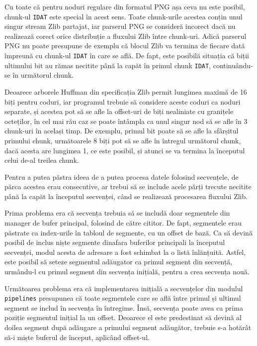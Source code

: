 \documentclass[a4paper,12pt]{report}
\begin{document}
Cu toate că pentru noduri regulare din formatul PNG așa ceva nu este posibil,
chunk-ul \texttt{IDAT} este special în acest sens.
Toate chunk-urile acestea conțin unul singur stream Zlib partajat,
iar parserul PNG se consideră incorect dacă nu realizează corect
orice distribuție a fluxului Zlib între chunk-uri.
Adică parserul PNG nu poate presupune de exemplu că blocul Zlib va termina de fiecare dată
împreună cu chunk-ul \texttt{IDAT} în care se află.
De fapt, este posibilă situația că biții ultimului bit au rămas necitite până la capăt
în primul chunk \texttt{IDAT}, continuându-se în următorul chunk.

Deoarece arborele Huffman din specificația Zlib permit lungimea maximă de 16 biți pentru coduri,
iar programul trebuie să considere aceste coduri ca noduri separate,
și acestea pot să se afle la offset-uri de biți nealiniate cu granițele octeților,
în cel mai rău caz se poate întâmpla ca unul singur nod să se afle în 3 chunk-uri în același timp.
De exemplu, primul bit poate să se afle la sfârșitul primului chunk,
următoarele 8 biți pot să se afle în întregul următorul chunk, dacă acesta are lungimea 1, ce este posibil,
și atunci se va termina la începutul celui de-al treilea chunk.

Pentru a putea păstra ideea de a putea procesa datele folosind secvențele,
de părca acestea erau consecutive, ar trebui să se include acele părți trecute necitite până la capăt
la începutul secvenței, când se realizează procesarea fluxului Zlib.

Prima problema era că secvența trebuia să se includă doar segmentele din manager de bufer principal,
folosind de către cititor.
De fapt, segmentele erau păstrate ca index-urile în tabloul de segmente, cu un offset de bază.
Ca să devină posibil de inclus niște segmente dinafara buferilor principali la începutul secvenței,
modul acesta de adresare a fost schimbat la o listă înlănțuită.
Astfel, este posibil să seteze segmentul adăugator ca primul segment din secvență, urmându-l cu
primul segment din secvența inițială, pentru a crea secvența nouă.

Următoarea problema era că implementarea inițială a secvențelor din modulul \texttt{pipelines} presupunea
că toate segmentele care se află între primul și ultimul segment se includ în secvența în întregime.
Însă, secvența poate avea ca prima poziție segmentul inițial la un offset.
Deoarece el este predestinat să devină al doilea segment după adăugare a primului segment adăugător,
trebuie s-a hotărât să-i miște buferul de început, aplicând offset-ul.
\end{document}
